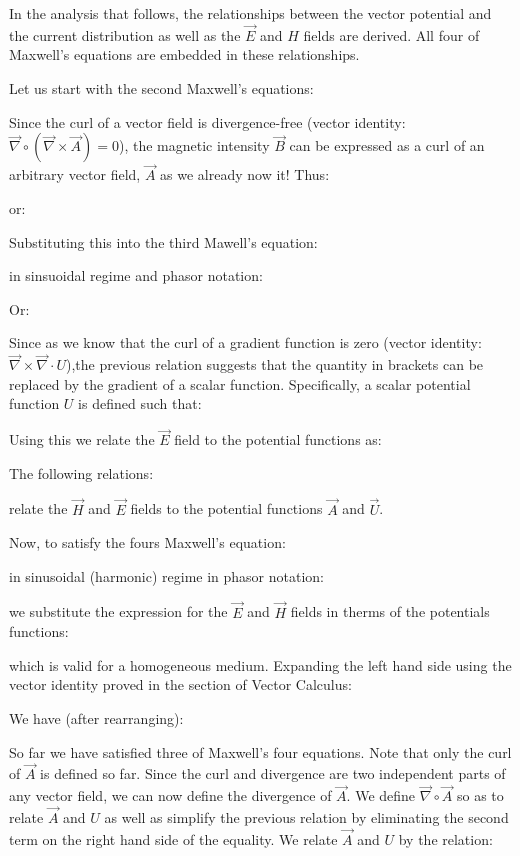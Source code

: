 	In the analysis that follows, the relationships between the vector potential and the current distribution as well as the $\vec{E}$ and $H$ fields are derived. All four of Maxwell’s equations are embedded in these relationships.
	
	Let us start with the second Maxwell’s equations:
		
	Since the curl of a vector field is divergence-free (vector identity: $\vec{\nabla}\circ(\vec{\nabla}\times\vec{A})=0$), the magnetic intensity $\vec{B}$ can be expressed as a curl of an arbitrary vector field, $\vec{A}$ as we already now it! Thus:
	
	or:
	
	Substituting this into the third Mawell's equation:
		
	 in sinsuoidal regime and phasor notation:
	
	Or:
	
	Since as we know that the curl of a gradient function is zero (vector identity: $\vec{\nabla}\times\vec{\nabla}\cdot U$),the previous relation suggests that the quantity in brackets can be replaced by the gradient of a scalar function. Specifically, a scalar potential function $U$ is defined such that:
	
	Using this we relate the $\vec{E}$ field to the potential functions as:
	
	The following relations:
	
	relate the $\vec{H}$ and $\vec{E}$ fields  to  the  potential functions $\vec{A}$ and $\vec{U}$.
	
	Now, to satisfy the fours Maxwell's equation:
	
	in sinusoidal (harmonic) regime in phasor notation:
	
	we substitute the expression for the $\vec{E}$ and $\vec{H}$ fields in therms of the potentials functions:
	
	which is valid for a homogeneous medium. Expanding the left hand side using the vector identity proved in the section of Vector Calculus:
	
	We have (after rearranging):
	
	So far we have satisfied three of Maxwell’s four equations. Note that only the  curl of $\vec{A}$ is  defined  so  far.  Since  the  curl  and  divergence  are  two independent parts of any vector field, we can now define the divergence of $\vec{A}$. We define $\vec{\nabla}\circ\vec{A}$ so as to relate $\vec{A}$ and $U$ as well as simplify the previous relation by eliminating the second term on the right hand side of the equality. We relate $\vec{A}$ and $U$ by the relation:
	
